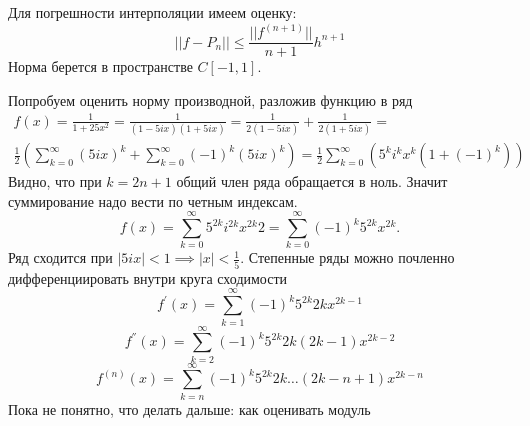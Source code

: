\documentclass[12pt,a4paper]{article}
\begin{document}
Для погрешности интерполяции имеем оценку:
\begin{equation}
||f - P_n|| \leq \frac{||f^ {(n+1)}||}{n + 1} h^{ n + 1}
\end{equation}
Норма берется в пространстве $C[-1, 1]$.

Попробуем оценить норму производной, разложив функцию в ряд
	\begin{equation}
	\begin{split}
	f(x) = \frac{1}{1 + 25x^2} = \frac{1}{(1-5ix)(1+5ix)} = \frac{1}{2(1-5ix)} + \frac{1}{2(1+5ix)} = \\ \frac{1}{2} (\sum_{k=0}^\infty(5ix)^k + \sum_{k=0}^\infty(-1)^k(5ix)^k) = \frac{1}{2}\sum_{k=0}^\infty(5^k i^k x^k (1 + (-1)^k))
	\end{split}
	\end{equation}
Видно, что при $k = 2n+1$ общий член ряда обращается в ноль. Значит суммирование надо вести по четным индексам.
\begin{equation}
f(x)  = \sum_{k=0}^\infty5^{2k} i^{2k} x^{2k}  2 = \sum_{k=0}^\infty(-1)^k5^{2k} x^{2k}.
\end{equation}
Ряд сходится при $ |5ix|< 1 \implies |x| < \frac{1}{5} $.
Степенные ряды можно почленно дифференциировать внутри круга сходимости
\begin{equation}
f^{ ' }(x) = \sum_{k=1}^\infty (-1)^k 5^{2k} 2k x^{2k-1}
\end{equation}
\begin{equation}
f^{ '' }(x) = \sum_{k=2}^\infty (-1)^k 5^{2k} 2k(2k-1) x^{2k-2}
\end{equation}
\begin{equation}
f^{ (n) }(x) = \sum_{k=n}^\infty (-1)^k 5^{2k} 2k  \ldots (2k - n + 1) x^{2k - n}
\end{equation}
Пока не понятно, что делать дальше: как оценивать модуль 
\newpage
\end{document}
